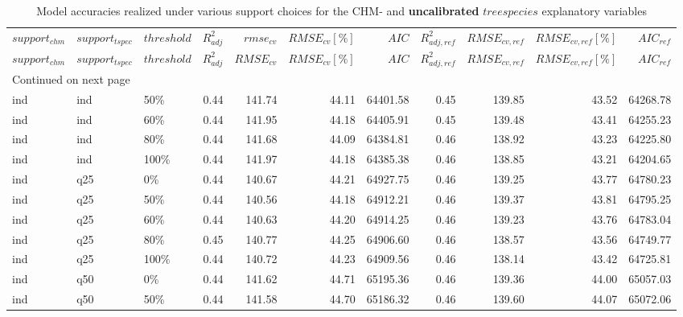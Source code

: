 \begingroup\fontsize{7pt}{8pt}\selectfont
\begin{longtable}{lllrrrrrrrr}
	\caption{Model accuracies realized under various 
		support choices for the CHM- and \textbf{uncalibrated} $treespecies$ 
		explanatory variables}\\ \\
	\hline
    $support_{chm}$ & $support_{tspec}$ & $threshold$ & $R^2_{adj}$ & $rmse_{cv}$ & $RMSE_{cv}[\%]$ & $AIC$ & $R^2_{adj, ref}$ & $RMSE_{cv, ref}$ & $RMSE_{cv, ref}[\%]$ & $AIC_{ref}$ \\ 
	\hline
	\endfirsthead
	\hline
    $support_{chm}$ & $support_{tspec}$ & $threshold$ & $R^2_{adj}$ & $RMSE_{cv}$ & $RMSE_{cv}[\%]$ & $AIC$ & $R^2_{adj, ref}$ & $RMSE_{cv, ref}$ & $RMSE_{cv, ref}[\%]$ & $AIC_{ref}$ \\ 
	\hline
	\endhead
	\hline
	\multicolumn{11}{l}{\footnotesize Continued on next page}
	\endfoot
	\endlastfoot
ind & ind & 0\% & 0.44 & 142.03 & 44.20 & 64408.57 & 0.45 & 139.71 & 43.48 & 64256.93 \\ 
  ind & ind & 50\% & 0.44 & 141.74 & 44.11 & 64401.58 & 0.45 & 139.85 & 43.52 & 64268.78 \\ 
  ind & ind & 60\% & 0.44 & 141.95 & 44.18 & 64405.91 & 0.45 & 139.48 & 43.41 & 64255.23 \\ 
  ind & ind & 80\% & 0.44 & 141.68 & 44.09 & 64384.81 & 0.46 & 138.92 & 43.23 & 64225.80 \\ 
  ind & ind & 100\% & 0.44 & 141.97 & 44.18 & 64385.38 & 0.46 & 138.85 & 43.21 & 64204.65 \\ 
  ind & q25 & 0\% & 0.44 & 140.67 & 44.21 & 64927.75 & 0.46 & 139.25 & 43.77 & 64780.23 \\ 
  ind & q25 & 50\% & 0.44 & 140.56 & 44.18 & 64912.21 & 0.46 & 139.37 & 43.81 & 64795.25 \\ 
  ind & q25 & 60\% & 0.44 & 140.63 & 44.20 & 64914.25 & 0.46 & 139.23 & 43.76 & 64783.04 \\ 
  ind & q25 & 80\% & 0.45 & 140.77 & 44.25 & 64906.60 & 0.46 & 138.57 & 43.56 & 64749.77 \\ 
  ind & q25 & 100\% & 0.44 & 140.72 & 44.23 & 64909.56 & 0.46 & 138.14 & 43.42 & 64725.81 \\ 
  ind & q50 & 0\% & 0.44 & 141.62 & 44.71 & 65195.36 & 0.46 & 139.36 & 44.00 & 65057.03 \\ 
  ind & q50 & 50\% & 0.44 & 141.58 & 44.70 & 65186.32 & 0.46 & 139.60 & 44.07 & 65072.06 \\ 

\end{longtable}
